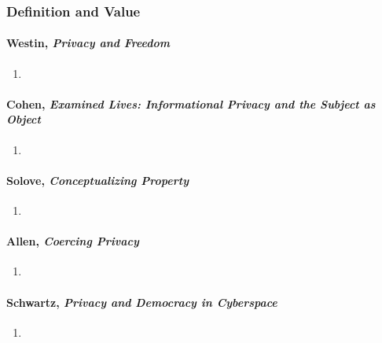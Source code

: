 \subsubsection{Definition and Value}

\paragraph{Westin, \emph{Privacy and Freedom}}

\begin{enumerate}
    \item %
\end{enumerate}

\paragraph{Cohen, \emph{Examined Lives: Informational Privacy and the Subject 
as Object}}

\begin{enumerate}
    \item %
\end{enumerate}

\paragraph{Solove, \emph{Conceptualizing Property}}

\begin{enumerate}
    \item %
\end{enumerate}

\paragraph{Allen, \emph{Coercing Privacy}}

\begin{enumerate}
    \item %
\end{enumerate}

\paragraph{Schwartz, \emph{Privacy and Democracy in Cyberspace}}

\begin{enumerate}
    \item %
\end{enumerate}

